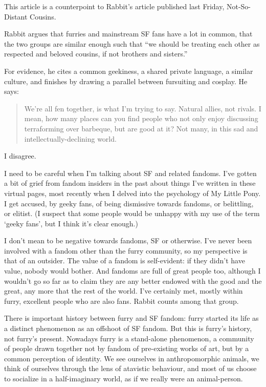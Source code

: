 
This article is a counterpoint to Rabbit's article published last Friday, Not-So-Distant Cousins.

Rabbit argues that furries and mainstream SF fans have a lot in common, that the two groups are similar enough such that ``we should be treating each other as respected and beloved cousins, if not brothers and sisters.''

For evidence, he cites a common geekiness, a shared private language, a similar culture, and finishes by drawing a parallel between fursuiting and cosplay. He says:

\begin{quote}
  We're all fen together, is what I'm trying to say. Natural allies, not rivals. I mean, how many places can you find people who not only enjoy discussing terraforming over barbeque, but are good at it? Not many, in this sad and intellectually-declining world.
\end{quote}

I disagree.

I need to be careful when I'm talking about SF and related fandoms. I've gotten a bit of grief from fandom insiders in the past about things I've written in these virtual pages, most recently when I delved into the psychology of My Little Pony. I get accused, by geeky fans, of being dismissive towards fandoms, or belittling, or elitist. (I suspect that some people would be unhappy with my use of the term `geeky fans', but I think it's clear enough.)

I don't mean to be negative towards fandoms, SF or otherwise. I've never been involved with a fandom other than the furry community, so my perspective is that of an outsider. The value of a fandom is self-evident: if they didn't have value, nobody would bother. And fandoms are full of great people too, although I wouldn't go so far as to claim they are any better endowed with the good and the great, any more that the rest of the world. I've certainly met, mostly within furry, excellent people who are also fans. Rabbit counts among that group.

There is important history between furry and SF fandom: furry started its life as a distinct phenomenon as an offshoot of SF fandom. But this is furry's history, not furry's present. Nowadays furry is a stand-alone phenomenon, a community of people drawn together not by fandom of pre-existing works of art, but by a common perception of identity. We see ourselves in anthropomorphic animals, we think of ourselves through the lens of atavistic behaviour, and most of us choose to socialize in a half-imaginary world, as if we really were an animal-person.


